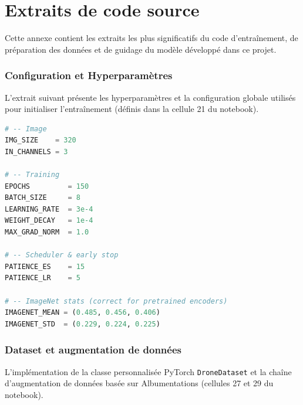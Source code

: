 \appendix

\chapter{Extraits de code source}
\label{ann:code}

Cette annexe contient les extraits les plus significatifs du code d'entraînement, de préparation des données et de guidage du modèle développé dans ce projet.

\subsection{Configuration et Hyperparamètres}

L'extrait suivant présente les hyperparamètres et la configuration globale utilisés pour initialiser l'entraînement (définis dans la cellule 21 du notebook).

\begin{lstlisting}[language=Python, caption={Hyperparamètres globaux d'entraînement.}]
# -- Image
IMG_SIZE    = 320
IN_CHANNELS = 3

# -- Training
EPOCHS         = 150
BATCH_SIZE     = 8
LEARNING_RATE  = 3e-4
WEIGHT_DECAY   = 1e-4
MAX_GRAD_NORM  = 1.0

# -- Scheduler & early stop
PATIENCE_ES    = 15
PATIENCE_LR    = 5

# -- ImageNet stats (correct for pretrained encoders)
IMAGENET_MEAN = (0.485, 0.456, 0.406)
IMAGENET_STD  = (0.229, 0.224, 0.225)
\end{lstlisting}

\subsection{Dataset et augmentation de données}
\label{sec:code-dataset-augmentation}

L'implémentation de la classe personnalisée PyTorch \texttt{DroneDataset} et la chaîne d'augmentation de données basée sur Albumentations (cellules 27 et 29 du notebook).

